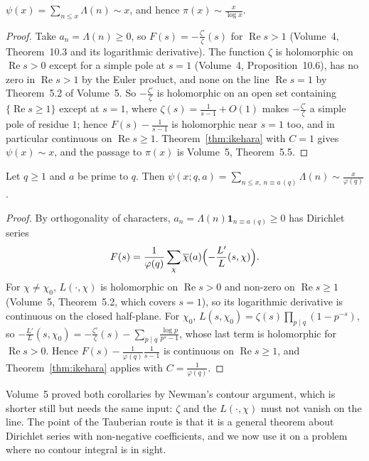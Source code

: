 \begin{corollary}\label{cor:pntikehara}
$\psi(x)=\sum_{n\le x}\Lambda(n)\sim x$, and hence $\pi(x)\sim\frac x{\log x}$.
\end{corollary}
\begin{proof}
Take $a_n=\Lambda(n)\ge0$, so $F(s)=-\frac{\zeta'}\zeta(s)$ for $\operatorname{Re}s>1$ (Volume~4, Theorem~10.3 and its logarithmic derivative). The function $\zeta$ is
holomorphic on $\operatorname{Re}s>0$ except for a simple pole at $s=1$ (Volume~4, Proposition~10.6), has no zero in $\operatorname{Re}s>1$ by the Euler product, and
none on the line $\operatorname{Re}s=1$ by Theorem~5.2 of Volume~5. So $-\frac{\zeta'}\zeta$ is holomorphic on an open set containing $\{\operatorname{Re}s\ge1\}$ except at
$s=1$, where $\zeta(s)=\frac1{s-1}+O(1)$ makes $-\frac{\zeta'}\zeta$ a simple pole of residue $1$; hence $F(s)-\frac1{s-1}$ is holomorphic near $s=1$ too, and in
particular continuous on $\operatorname{Re}s\ge1$. Theorem~\ref{thm:ikehara} with $C=1$ gives $\psi(x)\sim x$, and the passage to $\pi(x)$ is Volume~5,
Theorem~5.5.
\end{proof}

\begin{corollary}[progressions]\label{cor:pntapikehara}
Let $q\ge1$ and $a$ be prime to $q$. Then $\psi(x;q,a)=\sum_{n\le x,\,n\equiv a\,(q)}\Lambda(n)\sim\frac x{\varphi(q)}$.
\end{corollary}
\begin{proof}
By orthogonality of characters, $a_n=\Lambda(n)\mathbf 1_{n\equiv a\,(q)}\ge0$ has Dirichlet series
\[
F(s)=\frac1{\varphi(q)}\sum_\chi\overline\chi(a)\Bigl(-\frac{L'}L(s,\chi)\Bigr).
\]
For $\chi\ne\chi_0$, $L(\cdot,\chi)$ is holomorphic on $\operatorname{Re}s>0$ and non-zero on $\operatorname{Re}s\ge1$ (Volume~5, Theorem~5.2, which covers $s=1$), so its
logarithmic derivative is continuous on the closed half-plane. For $\chi_0$, $L(s,\chi_0)=\zeta(s)\prod_{p\mid q}(1-p^{-s})$, so
$-\frac{L'}L(s,\chi_0)=-\frac{\zeta'}\zeta(s)-\sum_{p\mid q}\frac{\log p}{p^s-1}$, whose last term is holomorphic for $\operatorname{Re}s>0$. Hence
$F(s)-\frac1{\varphi(q)}\frac1{s-1}$ is continuous on $\operatorname{Re}s\ge1$, and Theorem~\ref{thm:ikehara} applies with $C=\frac1{\varphi(q)}$.
\end{proof}

Volume~5 proved both corollaries by Newman's contour argument, which is shorter still but needs the same input: $\zeta$ and the $L(\cdot,\chi)$ must not
vanish on the line. The point of the Tauberian route is that it is a general theorem about Dirichlet series with non-negative coefficients, and we now use
it on a problem where no contour integral is in sight.

